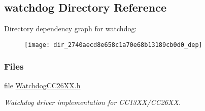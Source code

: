 \subsection{watchdog Directory Reference}
\label{dir_2740aecd8e658c1a70e68b13189cb0d0}
Directory dependency graph for watchdog\+:
\nopagebreak
\begin{figure}[H]
\begin{center}
\leavevmode
\texttt{[image: dir\_2740aecd8e658c1a70e68b13189cb0d0\_dep]}
\end{center}
\end{figure}
\subsubsection*{Files}
\begin{DoxyCompactItemize}
\item 
file \hyperlink{_watchdog_c_c26_x_x_8h}{Watchdog\+C\+C26\+X\+X.\+h}
\begin{DoxyCompactList}\small\item\em Watchdog driver implementation for C\+C13\+X\+X/\+C\+C26\+X\+X. \end{DoxyCompactList}\end{DoxyCompactItemize}
